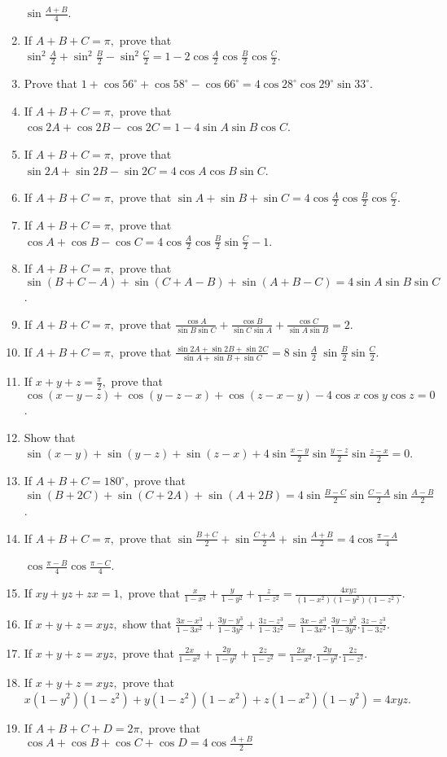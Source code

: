 \begin{enumerate}
  $\sin \frac{A + B}{4}$.
\item If $A + B + C = \pi,$ prove that $\sin^2\frac{A}{2} + \sin^2\frac{B}{2} - \sin^2\frac{C}{2} = 1 - 2\cos
  \frac{A}{2}\cos \frac{B}{2}\cos \frac{C}{2}$.
\item Prove that $1 + \cos 56^\circ + \cos 58^\circ - \cos 66^\circ = 4\cos28^\circ\cos29^\circ\sin 33^\circ$.
\item If $A + B + C = \pi,$ prove that $\cos 2A + \cos 2B - \cos 2C = 1 - 4\sin A\sin B\cos C$.
\item If $A + B + C = \pi,$ prove that $\sin 2A + \sin 2B - \sin 2C = 4\cos A\cos B\sin C$.
\item If $A + B + C = \pi,$ prove that $\sin A + \sin B + \sin C = 4\cos \frac{A}{2}\cos \frac{B}{2}\cos \frac{C}{2}$.
\item If $A + B + C = \pi,$ prove that $\cos A + \cos B - \cos C = 4\cos \frac{A}{2}\cos \frac{B}{2}\sin \frac{C}{2} - 1$.
\item If $A + B + C = \pi,$ prove that $\sin(B + C - A) + \sin(C + A - B) + \sin(A + B - C) = 4\sin A\sin B\sin C$.
\item If $A + B + C = \pi,$ prove that $\frac{\cos A}{\sin B\sin C} + \frac{\cos B}{\sin C\sin A} + \frac{\cos C}{\sin
  A\sin B} = 2$.
\item If $A + B + C = \pi,$ prove that $\frac{\sin 2A + \sin 2B + \sin 2C}{\sin A + \sin B + \sin C} = 8\sin \frac{A}{2}\
  \sin \frac{B}{2}\sin \frac{C}{2}$.
\item If $x + y + z = \frac{\pi}{2},$ prove that $\cos(x - y - z) + \cos(y - z - x) + \cos(z - x - y) - 4\cos x\cos y\cos
  z = 0$.
\item Show that $\sin(x - y) + \sin(y - z) + \sin(z - x) + 4\sin\frac{x - y}{2}\sin\frac{y - z}{2}\sin \frac{z - x}{2} = 0$.
\item If $A + B + C = 180^\circ,$ prove that $\sin(B + 2C) + \sin(C + 2A) + \sin(A + 2B) = 4\sin\frac{B - C}{2}
  \sin\frac{C - A}{2}\sin\frac{A - B}{2}$.
\item If $A + B + C = \pi,$ prove that $\sin\frac{B + C}{2} + \sin \frac{C + A}{2} + \sin \frac{A + B}{2} =
  4\cos\frac{\pi - A}{4}$

  $\cos\frac{\pi - B}{4}\cos\frac{\pi - C}{4}$.
\item If $xy + yz + zx = 1,$ prove that $\frac{x}{1 - x^2} + \frac{y}{1 - y^2} + \frac{z}{1 - z^2} = \frac{4xyz}{(1 -
  x^2)(1 - y^2)(1 - z^2)}$.
\item If $x + y + z = xyz,$ show that $\frac{3x - x^3}{1 - 3x^2} + \frac{3y - y^3}{1 - 3y^2} + \frac{3z - z^3}{1 - 3z^2}
  = \frac{3x - x^3}{1 - 3x^2}.\frac{3y - y^3}{1 - 3y^2}.\frac{3z - z^3}{1 - 3z^2}$.
\item If $x + y + z = xyz,$ prove that $\frac{2x}{1 - x^2} + \frac{2y}{1 - y^2} + \frac{2z}{1 - z^2} = \frac{2x}{1 -
    x^2}.\frac{2y}{1 - y^2}.\frac{2z}{1 - z^2}$.
\item If $x + y + z = xyz,$ prove that $x(1 - y^2)(1 - z^2) + y(1 - z^2)(1 - x^2) + z(1 - x^2)(1 - y^2) = 4xyz$.
\item If $A + B + C + D = 2\pi,$ prove that $\cos A + \cos B + \cos C + \cos D = 4\cos\frac{A + B}{2}$


\end{enumerate}
